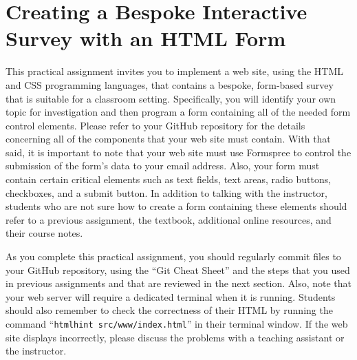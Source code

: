 \documentclass[11pt]{article}
\newcommand{\mainprogramsource}{\lstinline{src/www/index.html}}
\newcommand{\command}[1]{``\lstinline{#1}''}
\newcommand{\program}[1]{\lstinline{#1}}
\begin{document}
\section*{Creating a Bespoke Interactive Survey with an HTML Form}

This practical assignment invites you to implement a web site, using the HTML
and CSS programming languages, that contains a bespoke, form-based survey that
is suitable for a classroom setting. Specifically, you will identify your own
topic for investigation and then program a form containing all of the needed
form control elements. Please refer to your GitHub repository for the details
concerning all of the components that your web site must contain. With that
said, it is important to note that your web site must use Formspree to control
the submission of the form's data to your email address. Also, your form must
contain certain critical elements such as text fields, text areas, radio
buttons, checkboxes, and a submit button. In addition to talking with the
instructor, students who are not sure how to create a form containing these
elements should refer to a previous assignment, the textbook, additional online
resources, and their course notes.


As you complete this practical assignment, you should regularly commit files to
your GitHub repository, using the ``Git Cheat Sheet'' and the steps that you
used in previous assignments and that are reviewed in the next section. Also,
note that your web server will require a dedicated terminal when it is running.
Students should also remember to check the correctness of their HTML by running
the command \command{htmlhint src/www/index.html} in their terminal window. If
the web site displays incorrectly, please discuss the problems with a teaching
assistant or the instructor.
\end{document}
